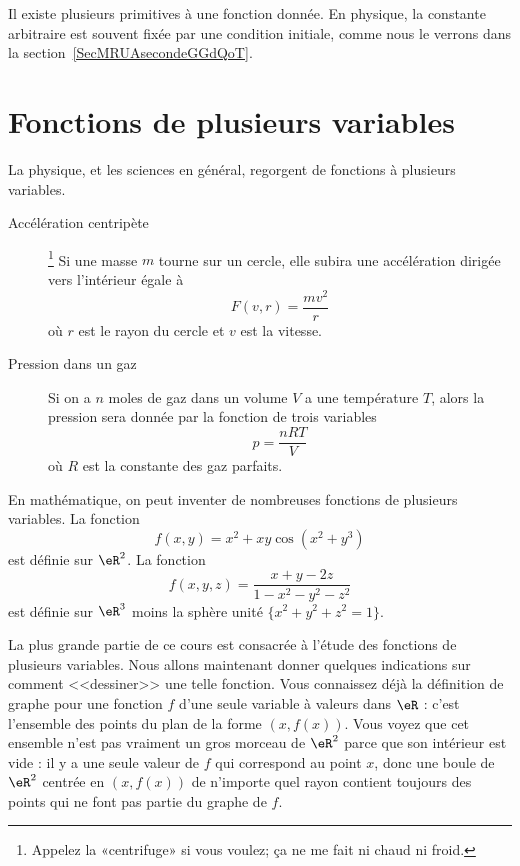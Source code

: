 \begin{normaltext}
	Il existe plusieurs primitives à une fonction donnée. En physique, la constante arbitraire est souvent fixée par une condition initiale, comme nous le verrons dans la section~\ref{SecMRUAsecondeGGdQoT}.
\end{normaltext}

\section{Fonctions de plusieurs variables}

La physique, et les sciences en général, regorgent de fonctions à plusieurs variables.
\begin{description}
	\item[Accélération centripète]\footnote{Appelez la «centrifuge» si vous voulez; ça ne me fait ni chaud ni froid.}  Si une masse \( m\) tourne sur un cercle, elle subira une accélération dirigée vers l'intérieur égale à
	      \begin{equation}
		      F(v,r)=\frac{ mv^2 }{ r }
	      \end{equation}
	      où \( r\) est le rayon du cercle et \( v\) est la vitesse.
	\item[Pression dans un gaz] Si on a \( n\) moles de gaz dans un volume \( V\) a une température \( T\), alors la pression sera donnée par la fonction de trois variables
	      \begin{equation}
		      p=\frac{ nRT }{ V }
	      \end{equation}
	      où \( R\) est la constante des gaz parfaits.
\end{description}

En mathématique, on peut inventer de nombreuses fonctions de plusieurs variables. La fonction
\begin{equation}
	f(x,y)=x^2+xy\cos(x^2+y^3)
\end{equation}
est définie sur \( \eR^2\). La fonction
\begin{equation}
	f(x,y,z)=\frac{ x+y-2z }{ 1-x^2-y^2-z^2 }
\end{equation}
est définie sur \( \eR^3\) moins la sphère unité \( \{ x^2+y^2+z^2=1 \}\).

La plus grande partie de ce cours est consacrée à l'étude des fonctions de plusieurs variables. Nous allons maintenant donner quelques indications sur comment <<dessiner>> une telle fonction. Vous connaissez déjà la définition de graphe pour une fonction \( f\) d'une seule variable à valeurs dans \( \eR\) : c'est l'ensemble des points du plan de la forme \( (x, f(x))\). Vous voyez que cet ensemble n'est pas vraiment un gros morceau de \( \eR^2\) parce que son intérieur est vide : il y a une seule valeur de \( f\) qui correspond au point \( x\), donc une boule de \( \eR^2\) centrée en \( (x, f(x))\) de n'importe quel rayon contient toujours des points qui ne font pas partie du graphe de \( f\).

